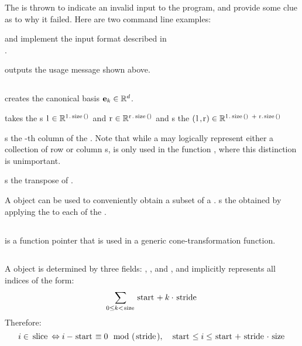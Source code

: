The  is thrown to indicate an invalid input to the program, and provide some clue as to why it failed.  Here are two command line examples:

\lstinputerror

 and  implement the input format described in \\.
\lstissV
\lstossV

 outputs the usage message shown above.
\lstusage

\subsection{}
 creates the canonical basis  $\mathbf{e}_k \in \mathbb{R}^d$.
\lstek

 takes the s $\mli{l} \in \R^{\mli{l.size()}}$ and $\mli{r} \in \R^{\mli{r.size()}}$ and s the  $(\mli{l,r}) \in \R^{\mli{l.size() + r.size()}}$
\lstconcatenate

 s the -th column of the .  Note that while a  may logically represent either a collection of row or column s,  is only used in the function , where this distinction is unimportant.
\lstgetcolumn

 s the transpose of .
\lsttranspose

A  object can be used to conveniently obtain a subset of a .   s the  obtained by applying the  to each  of the .
\lstslicematrix

\subsection{}

 is a function pointer  that is used in a generic cone-transformation function.
\lstLift

\subsection{}

A  object is determined by three fields: , , and , and implicitly represents all indices of the form:
\[ \sum_{0 \leq k < \mli{size}} \mli{start} + k\cdot\mli{stride} \]
Therefore:
\[ i \in \mli{slice} \Leftrightarrow i - \mli{start} \equiv 0 \mod(\mli{stride}),
	\quad \mli{start} \leq i \leq \mli{start} + {\mli{stride}}\cdot\mli{size} \]
\lstindexinslice

